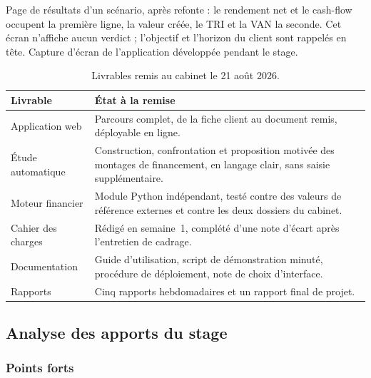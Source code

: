 \documentclass[12pt,a4paper]{article}
\newcommand{\datefin}{21 août 2026}
\begin{document}
{Page de résultats d'un scénario, après refonte : le rendement net et le
	cash-flow occupent la première ligne, la valeur créée, le TRI et la VAN la
	seconde. Cet écran n'affiche aucun verdict ; l'objectif et l'horizon du client
	sont rappelés en tête.}
{Capture d'écran de l'application développée pendant le stage.}

\vspace{-0.4em}
\begin{table}[H]
	\centering
	\small
	\renewcommand{\arraystretch}{1.40}
	\begin{tabular}{|>{\raggedright\arraybackslash}p{4.5cm}|>{\raggedright\arraybackslash}p{10.4cm}|}
		\hline
		\rowcolor{eccblue!15}
		\textbf{\color{eccblue}Livrable} & \textbf{\color{eccblue}État à la remise} \\
		\hline
		\rowcolor{white}
		Application web & Parcours complet, de la fiche client au document remis,
		déployable en ligne. \\
		\hline
		\rowcolor{gray!8}
		Étude automatique & Construction, confrontation et proposition motivée des
		montages de financement, en langage clair, sans saisie supplémentaire. \\
		\hline
		\rowcolor{white}
		Moteur financier & Module Python indépendant, testé contre des valeurs de
		référence externes et contre les deux dossiers du cabinet. \\
		\hline
		\rowcolor{gray!8}
		Cahier des charges & Rédigé en semaine~1, complété d'une note d'écart
		après l'entretien de cadrage. \\
		\hline
		\rowcolor{white}
		Documentation & Guide d'utilisation, script de démonstration minuté,
		procédure de déploiement, note de choix d'interface. \\
		\hline
		\rowcolor{gray!8}
		Rapports & Cinq rapports hebdomadaires et un rapport final de projet. \\
		\hline
	\end{tabular}
	\caption{Livrables remis au cabinet le \datefin.}
\end{table}

\subsection{Analyse des apports du stage}

\subsubsection{Points forts}
\end{document}
